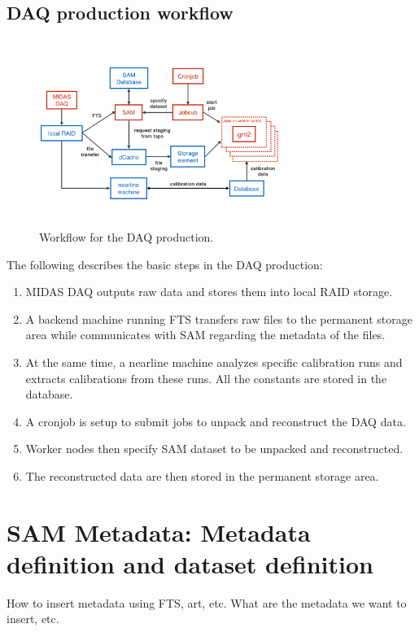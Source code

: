\documentclass[12pt,letterpaper]{article}
\begin{document}
\subsection{DAQ production workflow}

\begin{figure}[htbp]
\centering
\includegraphics[width=0.7\textwidth]{pics/DAQProductionWorkflow.pdf} 
\caption{Workflow for the DAQ production.}\label{fig:DAQProd}
\end{figure}

The following describes the basic steps in the DAQ production:
\begin{enumerate}
\item MIDAS DAQ outputs raw data and stores them into local RAID storage.
\item A backend machine running FTS transfers raw files to the permanent storage area while communicates with SAM regarding the metadata of the files.
\item At the same time, a nearline machine analyzes specific calibration runs and extracts calibrations from these runs. All the constants are stored in the database.
\item A cronjob is setup to submit jobs to unpack and reconstruct the DAQ data.
\item Worker nodes then specify SAM dataset to be unpacked and reconstructed.
\item The reconstructed data are then stored in the permanent storage area.
\end{enumerate}

\section{SAM Metadata: Metadata definition and dataset definition}
How to insert metadata using FTS, art, etc. What are the metadata we want to insert, etc.
\end{document}

